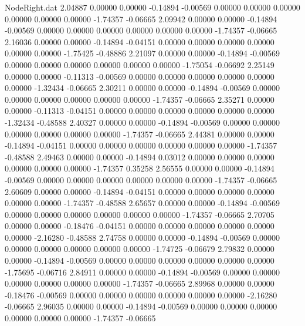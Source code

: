 \begin{filecontents}{NodeRight.dat}
   2.04887    0.00000    0.00000    -0.14894   -0.00569    0.00000    0.00000    0.00000    0.00000    0.00000    0.00000   -1.74357   -0.06665
   2.09942    0.00000    0.00000    -0.14894   -0.00569    0.00000    0.00000    0.00000    0.00000    0.00000    0.00000   -1.74357   -0.06665
   2.16036    0.00000    0.00000    -0.14894   -0.04151    0.00000    0.00000    0.00000    0.00000    0.00000    0.00000   -1.75425   -0.48886
   2.21097    0.00000    0.00000    -0.14894   -0.00569    0.00000    0.00000    0.00000    0.00000    0.00000    0.00000   -1.75054   -0.06692
   2.25149    0.00000    0.00000    -0.11313   -0.00569    0.00000    0.00000    0.00000    0.00000    0.00000    0.00000   -1.32434   -0.06665
   2.30211    0.00000    0.00000    -0.14894   -0.00569    0.00000    0.00000    0.00000    0.00000    0.00000    0.00000   -1.74357   -0.06665
   2.35271    0.00000    0.00000    -0.11313   -0.04151    0.00000    0.00000    0.00000    0.00000    0.00000    0.00000   -1.32434   -0.48588
   2.40327    0.00000    0.00000    -0.14894   -0.00569    0.00000    0.00000    0.00000    0.00000    0.00000    0.00000   -1.74357   -0.06665
   2.44381    0.00000    0.00000    -0.14894   -0.04151    0.00000    0.00000    0.00000    0.00000    0.00000    0.00000   -1.74357   -0.48588
   2.49463    0.00000    0.00000    -0.14894    0.03012    0.00000    0.00000    0.00000    0.00000    0.00000    0.00000   -1.74357    0.35258
   2.56555    0.00000    0.00000    -0.14894   -0.00569    0.00000    0.00000    0.00000    0.00000    0.00000    0.00000   -1.74357   -0.06665
   2.60609    0.00000    0.00000    -0.14894   -0.04151    0.00000    0.00000    0.00000    0.00000    0.00000    0.00000   -1.74357   -0.48588
   2.65657    0.00000    0.00000    -0.14894   -0.00569    0.00000    0.00000    0.00000    0.00000    0.00000    0.00000   -1.74357   -0.06665
   2.70705    0.00000    0.00000    -0.18476   -0.04151    0.00000    0.00000    0.00000    0.00000    0.00000    0.00000   -2.16280   -0.48588
   2.74758    0.00000    0.00000    -0.14894   -0.00569    0.00000    0.00000    0.00000    0.00000    0.00000    0.00000   -1.74725   -0.06679
   2.79832    0.00000    0.00000    -0.14894   -0.00569    0.00000    0.00000    0.00000    0.00000    0.00000    0.00000   -1.75695   -0.06716
   2.84911    0.00000    0.00000    -0.14894   -0.00569    0.00000    0.00000    0.00000    0.00000    0.00000    0.00000   -1.74357   -0.06665
   2.89968    0.00000    0.00000    -0.18476   -0.00569    0.00000    0.00000    0.00000    0.00000    0.00000    0.00000   -2.16280   -0.06665
   2.96035    0.00000    0.00000    -0.14894   -0.00569    0.00000    0.00000    0.00000    0.00000    0.00000    0.00000   -1.74357   -0.06665

\end{filecontents}
